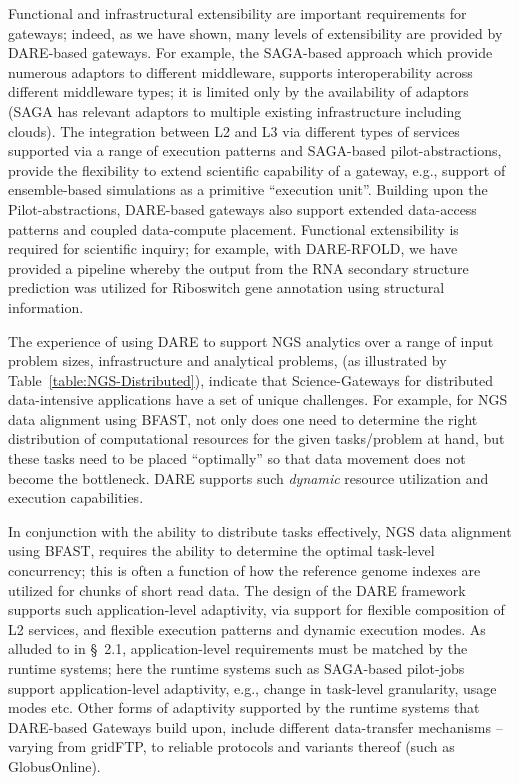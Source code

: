 \documentclass[]{svjour3}
\begin{document}
Functional and infrastructural extensibility are important
requirements for gateways; indeed, as we have shown, many levels of
extensibility are provided by DARE-based gateways. For example, the
SAGA-based approach which provide numerous adaptors to different
middleware, supports interoperability across different middleware
types; it is limited only by the availability of adaptors (SAGA has
relevant adaptors to multiple existing infrastructure including
clouds). The integration between L2 and L3 via different types of
services supported via a range of execution patterns and SAGA-based
pilot-abstractions, provide the flexibility to extend scientific
capability of a gateway, e.g., support of ensemble-based simulations
as a primitive ``execution unit''. Building upon the
Pilot-abstractions, DARE-based gateways also support extended
data-access patterns and coupled data-compute placement. Functional
extensibility is required for scientific inquiry; for example, with
DARE-RFOLD, we have provided a pipeline whereby the output from the
RNA secondary structure prediction was utilized for Riboswitch gene
annotation using structural information.

The experience of using DARE to support NGS analytics over a range of
input problem sizes, infrastructure and analytical problems, (as
illustrated by Table~\ref{table:NGS-Distributed}), indicate that
Science-Gateways for distributed data-intensive applications have a
set of unique challenges. For example, for NGS data alignment using
BFAST, not only does one need to determine the right distribution of
computational resources for the given tasks/problem at hand, but these
tasks need to be placed ``optimally'' so that data movement does not
become the bottleneck. DARE supports such {\it dynamic} resource
utilization and execution capabilities.


In conjunction with the ability to distribute tasks effectively, NGS
data alignment using BFAST, requires the ability to determine the
optimal task-level concurrency; this is often a function of how the
reference genome indexes are utilized for chunks of short read
data\cite{dare-ecmls11}. The design of the DARE framework supports
such application-level adaptivity, via support for flexible
composition of L2 services, and flexible execution patterns and
dynamic execution modes. As alluded to in \S~2.1, application-level
requirements must be matched by the runtime systems; here the runtime
systems such as SAGA-based pilot-jobs support application-level
adaptivity, e.g., change in task-level granularity, usage modes etc.
Other forms of adaptivity supported by the runtime systems that
DARE-based Gateways build upon, include different data-transfer
mechanisms -- varying from gridFTP, to reliable protocols and variants
thereof (such as GlobusOnline).
\end{document}
